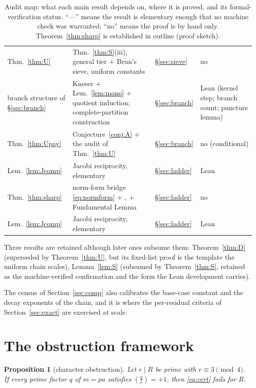 \documentclass[11pt]{article}
\theoremstyle{plain}
\newtheorem{proposition}[theorem]{Proposition}
\theoremstyle{remark}
\theoremstyle{plain}
\numberwithin{equation}{section}
\newcommand{\legendre}[2]{\genfrac{(}{)}{}{1}{#1}{#2}}
\begin{document}
\begin{table}[htbp]
\begin{tabular}{>{\raggedright\arraybackslash}p{2.6cm}>{\raggedright\arraybackslash}p{5.3cm}l>{\raggedright\arraybackslash}p{3.6cm}}
Thm.~\ref{thm:U} & Thm.~\ref{thm:S}(iii), general tier + Brun's sieve, uniform constants & \S\ref{sec:sieve} & no \\ \addlinespace
branch structure of \S\ref{sec:branch} & Kneser + Lem.~\ref{lem:mono} + quotient induction; complete-partition construction & \S\ref{sec:branch} & Lean (kernel step; branch count; puncture lemma) \\ \addlinespace
Thm.~\ref{thm:Upay} & Conjecture~\ref{conj:A} + the audit of Thm.~\ref{thm:U} & \S\ref{sec:branch} & no (conditional) \\ \addlinespace
Lem.~\ref{lem:Jcomp} & Jacobi reciprocity, elementary & \S\ref{sec:ladder} & Lean \\ \addlinespace
Thm.~\ref{thm:sharp} & norm-form bridge \eqref{eq:normform} + \cite{IwaniecPhiA}, \cite{FHRSS} + Fundamental Lemma & \S\ref{sec:ladder} & no \\
Lem.~\ref{lem:Jcomp} & Jacobi reciprocity, elementary & \S\ref{sec:ladder} & Lean \\
\bottomrule
\end{tabular}
\caption{Audit map: what each main result depends on, where it is
proved, and its formal-verification status. ``---'' means the result
is elementary enough that no machine check was warranted; ``no'' means
the proof is by hand only. Theorem~\ref{thm:sharp} is established in
outline (proof sketch).}
\label{tab:deps}
\end{table}

Three results are retained although later ones subsume them:
Theorem~\ref{thm:D} (superseded by Theorem~\ref{thm:U}, but its
fixed-list proof is the template the uniform chain scales),
Lemma~\ref{lem:S} (subsumed by Theorem~\ref{thm:S}, retained as the
machine-verified confirmation and the form the Lean development
carries).

The census of Section~\ref{sec:comp} also calibrates the base-case
constant and the decay exponents of the chain, and it is where the
per-residual criteria of Section~\ref{sec:exact} are exercised at
scale.

\section{The obstruction framework}\label{sec:obstruction}

\begin{proposition}[character obstruction]\label{prop:char}
Let $r \mid R$ be prime with $r \equiv 3 \pmod 4$. If every prime factor
$q$ of $m = pa$ satisfies $\legendre{q}{r} = +1$, then \eqref{eq:cert}
fails for $R$.
\end{proposition}
\end{document}
